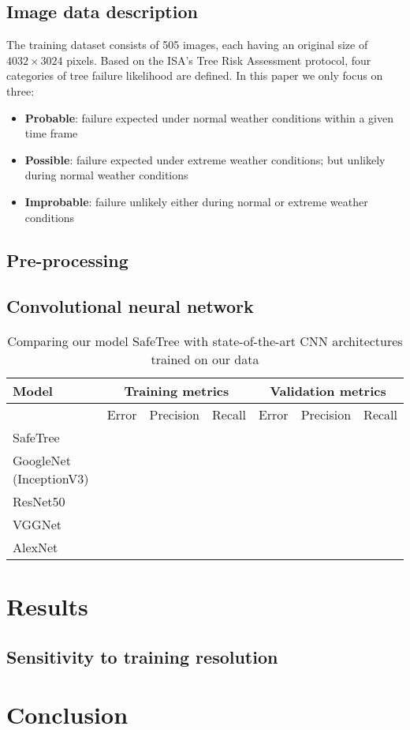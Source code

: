 \documentclass[11pt,twoside]{article}
\numberwithin{equation}{section}
\newcommand{\?}{\stackrel{?}{=}}
\begin{document}
\subsection{Image data description}
The training dataset consists of 505 images, each having an original size of $4032\times3024$ pixels. 
Based on the  ISA’s Tree Risk Assessment protocol, four categories of tree failure likelihood are defined. In this paper we only focus on three:
\begin{itemize}
\item \textbf{Probable}: failure expected under normal weather conditions within a given time frame
\item \textbf{Possible}: failure expected under extreme weather conditions; but unlikely during normal weather conditions
\item \textbf{Improbable}: failure unlikely either during normal or extreme weather conditions 
\end{itemize}

\subsection{Pre-processing}

\subsection{Convolutional neural network}


\begin{table}[h!]
  \centering
  \begin{tabular}{l l l l l l l }\toprule
    \bf Model & \multicolumn{3}{c}{\bf Training metrics} &\multicolumn{3}{c}{\bf Validation metrics}  \\\midrule
    & Error & Precision & Recall     & Error & Precision & Recall \\
    SafeTree & & & & & & \\
    GoogleNet (InceptionV3) & & & & & & \\
    ResNet50 & & & & & & \\
        VGGNet & & & & & & \\
    AlexNet & & & & & & \\\bottomrule
  \end{tabular}
  \caption{Comparing our model SafeTree with state-of-the-art CNN architectures trained on our data}
  \label{tab:comp}
\end{table}


\section{Results}

\subsection{Sensitivity to training resolution}

\section{Conclusion}

\printbibliography

\appendix
\end{document}
